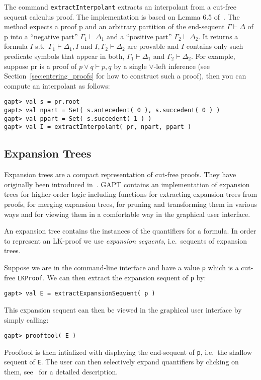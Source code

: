 \documentclass[a4paper,11pt]{article}
\newcommand{\seq}{\vdash}	%
\renewcommand{\lor}{\vee}
\newcommand{\cli}[1]{{\tt {#1}}}
\begin{document}
The command \texttt{extractInterpolant} extracts an interpolant from a cut-free
sequent calculus proof. The implementation is based on Lemma 6.5 of~\cite{Takeuti87Proof}. The method expects
a proof p and an arbitrary partition of the end-sequent $\Gamma \seq \Delta$ of p into a 
``negative part'' $\Gamma_1\seq\Delta_1$ and a ``positive part'' $\Gamma_2 \seq \Delta_2$.
It returns a formula $I$ s.t.\ $\Gamma_1\seq\Delta_1, I$ and $I,\Gamma_2\seq\Delta_2$
are provable and $I$ contains only such predicate symbols that appear in both, $\Gamma_1\seq\Delta_1$
and $\Gamma_2\seq\Delta_2$. For example, suppose pr is a proof of $p \lor q \seq p, q$
by a single $\lor$-left inference (see Section~\ref{sec:entering_proofs} for how to construct
such a proof), then you can compute an interpolant as follows:
\begin{lstlisting}
gapt> val s = pr.root
gapt> val npart = Set( s.antecedent( 0 ), s.succedent( 0 ) )
gapt> val ppart = Set( s.succedent( 1 ) )
gapt> val I = extractInterpolant( pr, npart, ppart )
\end{lstlisting}

\subsection{Expansion Trees}

Expansion trees are a compact representation of cut-free proofs. They have originally been
introduced in~\cite{Miller87Compact}. GAPT contains an implementation of
expansion trees for higher-order logic including functions for extracting expansion
trees from proofs, for merging expansion trees, for pruning and transforming them
in various ways and for viewing them in a comfortable way in the graphical user interface.

An expansion tree contains the instances of the quantifiers for a formula. In order
to represent an LK-proof we use {\em expansion sequents}, i.e.~sequents of expansion trees.

Suppose we are in the command-line interface and have a value \cli{p} which is a cut-free \cli{LKProof}.
We can then extract the expansion sequent of \cli{p} by:
\begin{lstlisting}
gapt> val E = extractExpansionSequent( p )
\end{lstlisting}
This expansion sequent can then be viewed in the graphical user interface by simply calling:
\begin{lstlisting}
gapt> prooftool( E )
\end{lstlisting}
Prooftool is then intialized with displaying the end-sequent of \cli{p}, i.e.\ the shallow sequent
of \cli{E}. The user can then selectively expand quantifiers by clicking on them, see~\cite{Hetzl13Understanding}
for a detailed description.
\end{document}
